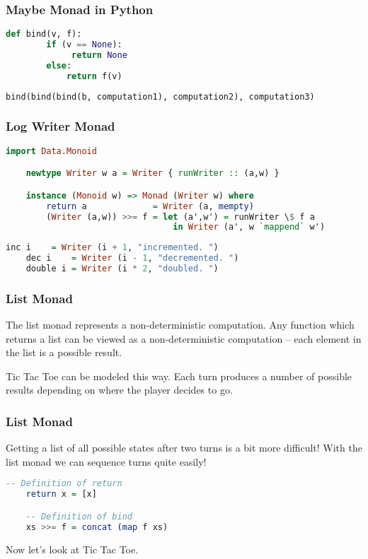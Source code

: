 \documentclass[presentation.tex]{subfiles}
\begin{document}
\begin{frame}[fragile]
  \frametitle{Maybe Monad in Python}
  \begin{lstlisting}[frame=single,language=Python,breaklines=true]
    def bind(v, f):
        if (v == None):
             return None
        else:			
            return f(v)
  \end{lstlisting}

  \begin{lstlisting}[frame=single,language=Python,breaklines=true]
    bind(bind(bind(b, computation1), computation2), computation3)
  \end{lstlisting}
\end{frame}


\begin{frame}[fragile]
  \frametitle{Log Writer Monad}
  \begin{lstlisting}[frame=single,language=Haskell,breaklines=true]
    import Data.Monoid

    newtype Writer w a = Writer { runWriter :: (a,w) }

    instance (Monoid w) => Monad (Writer w) where
        return a             = Writer (a, mempty)
        (Writer (a,w)) >>= f = let (a',w') = runWriter \$ f a
                                 in Writer (a', w `mappend` w')
  \end{lstlisting}
  \pause
  \begin{lstlisting}[frame=single,language=Haskell,breaklines=true]
    inc i    = Writer (i + 1, "incremented. ")
    dec i    = Writer (i - 1, "decremented. ")
    double i = Writer (i * 2, "doubled. ")
  \end{lstlisting}
\end{frame}

\begin{frame}
  \frametitle{List Monad}

  The list monad represents a non-deterministic computation. Any
  function which returns a list can be viewed as a non-deterministic
  computation -- each element in the list is a possible result.

  Tic Tac Toe can be modeled this way. Each turn produces a number of
  possible results depending on where the player decides to go.
\end{frame}

\begin{frame}[fragile]
  \frametitle{List Monad}

  Getting a list of all possible states after two turns is a bit more
  difficult! With the list monad we can sequence turns quite easily!

  \begin{lstlisting}[frame=single,language=Haskell,breaklines=true]
    -- Definition of return
    return x = [x]

    -- Definition of bind
    xs >>= f = concat (map f xs)
  \end{lstlisting}

  Now let's look at Tic Tac Toe.
\end{frame}
\end{document}
